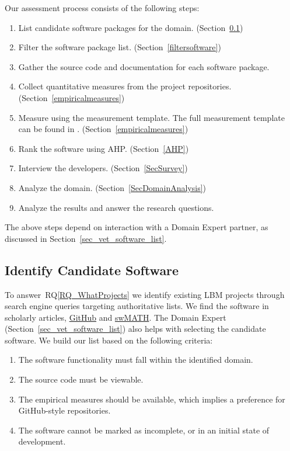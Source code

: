 \documentclass[final, 3p, times, authoryear]{elsarticle}
\newcommand{\rqref}[1]{RQ\ref{#1}}
\begin{document}
Our assessment process consists of the following steps: 

\begin{enumerate}
	\item List candidate software packages for the domain.
	(Section~\ref{identifysoftware})
	\item Filter the software package list. (Section~\ref{filtersoftware})
	\item Gather the source code and documentation for each software package.
	\item Collect quantitative measures from the project repositories.
	(Section~\ref{empiricalmeasures})
	\item Measure using the measurement template.  The full measurement template
	can be found in \citet{SmithEtAl2021}. (Section~\ref{empiricalmeasures})
	\item Rank the software using AHP. (Section~\ref{AHP})
	\item Interview the developers. (Section~\ref{SecSurvey})
	\item Analyze the domain. (Section~\ref{SecDomainAnalysis})
	\item Analyze the results and answer the research questions.
\end{enumerate}

\noindent The above steps depend on interaction with a Domain Expert partner, as
discussed in Section~\ref{sec_vet_software_list}.

\subsection{Identify Candidate Software} \label{identifysoftware}

To answer~\rqref{RQ_WhatProjects} we identify existing LBM projects through
search engine queries targeting authoritative lists. We find the software in
scholarly articles, \href{https://github.com/} {GitHub} and
\href{https://swmath.org/} {swMATH}. The Domain Expert
(Section~\ref{sec_vet_software_list}) also helps with selecting the candidate
software.  We build our list based on the following criteria:

\begin{enumerate}
	\item The software functionality must fall within the identified domain.
	\item The source code must be viewable.
	\item The empirical measures should be available, which implies a preference
	for GitHub-style repositories.
	\item The software cannot be marked as incomplete, or in an initial state of
	development.
\end{enumerate}
\end{document}
